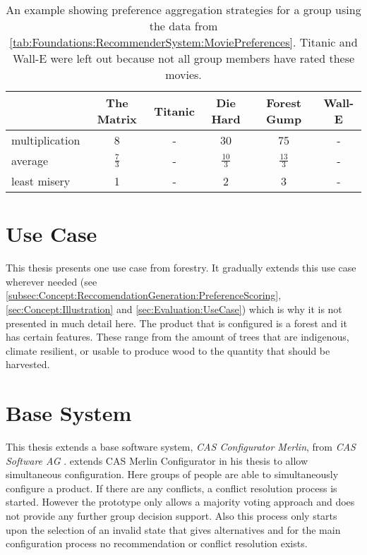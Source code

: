 \begin{table}
    \centering    
    \begin{tabular}{ l | c | c | c | c | c }
        & The Matrix & Titanic & Die Hard & Forest Gump & Wall-E \\ \hline
         multiplication  & 8 & - & 30 & 75 & - \\
         average  & $\frac{7}{3}$ & - & $\frac{10}{3}$ & $\frac{13}{3}$ & - \\
         least misery  & 1 & - & 2 & 3 & - \\
    \end{tabular}
    \caption[Movies: Result Matrix for Group Aggregation Strategies]{An example showing preference aggregation strategies for a group using the data from \autoref{tab:Foundations:RecommenderSystem:MoviePreferences}. Titanic and Wall-E were left out because not all group members have rated these movies.}
    \label{tab:Foundations:RecommenderSystem:AggregationStrategy}
\end{table}


\section{Use Case}
\label{sec:Foundations:UseSystem}

This thesis presents one use case from forestry. It gradually extends this use case wherever needed (see \autoref{subsec:Concept:ReccomendationGeneration:PreferenceScoring}, \autoref{sec:Concept:Illustration} and \autoref{sec:Evaluation:UseCase}) which is why it is not presented in much detail here. The product that is configured is a forest and it has certain features. These range from the amount of trees that are indigenous, climate resilient, or usable to produce wood to the quantity that should be harvested. 

\section{Base System}
\label{sec:Foundations:BaseSystem}

This thesis extends a base software system, \emph{CAS Configurator Merlin}, from \emph{CAS Software AG} \cite{CASSoftwareAG}. \citeauthor{raabKollaborativeProduktkonfigurationEchtzeit2019} \cite{raabKollaborativeProduktkonfigurationEchtzeit2019} extends CAS Merlin Configurator in his thesis to allow simultaneous configuration. Here groups of people are able to simultaneously configure a product. If there are any conflicts, a conflict resolution process is started. However the prototype only allows a majority voting approach and does not provide any further group decision support. Also this process only starts upon the selection of an invalid state that gives alternatives and for the main configuration process no recommendation or conflict resolution exists.

